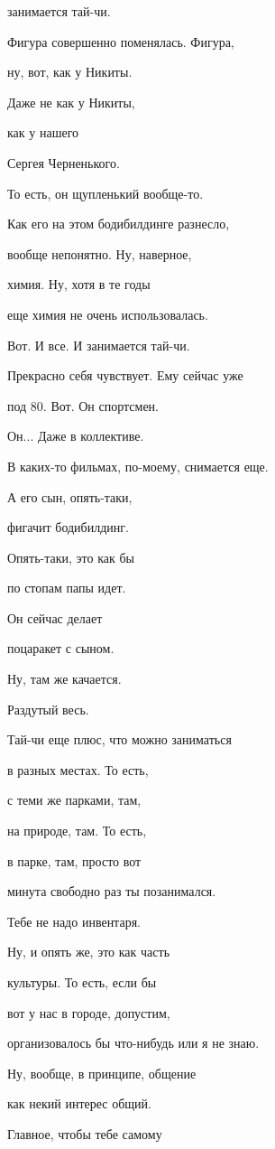 занимается тай-чи.

Фигура совершенно поменялась. Фигура,

ну, вот, как у Никиты.

Даже не как у Никиты,

как у нашего

Сергея Черненького.

То есть, он щупленький вообще-то.

Как его на этом бодибилдинге разнесло,

вообще непонятно. Ну, наверное,

химия. Ну, хотя в те годы

еще химия не очень использовалась.

Вот. И все. И занимается тай-чи.

Прекрасно себя чувствует. Ему сейчас уже

под 80. Вот. Он спортсмен.

Он... Даже в коллективе.

В каких-то фильмах, по-моему, снимается еще.

А его сын, опять-таки,

фигачит бодибилдинг.

Опять-таки, это как бы

по стопам папы идет.

Он сейчас делает

поцаракет с сыном.

Ну, там же качается.

Раздутый весь.

Тай-чи еще плюс, что можно заниматься

в разных местах. То есть,

с теми же парками, там,

на природе, там. То есть,

в парке, там, просто вот

минута свободно раз ты позанимался.

Тебе не надо инвентаря.

Ну, и опять же, это как часть

культуры. То есть, если бы

вот у нас в городе, допустим,

организовалось бы что-нибудь или я не знаю.

Ну, вообще, в принципе, общение

как некий интерес общий.

Главное, чтобы тебе самому

